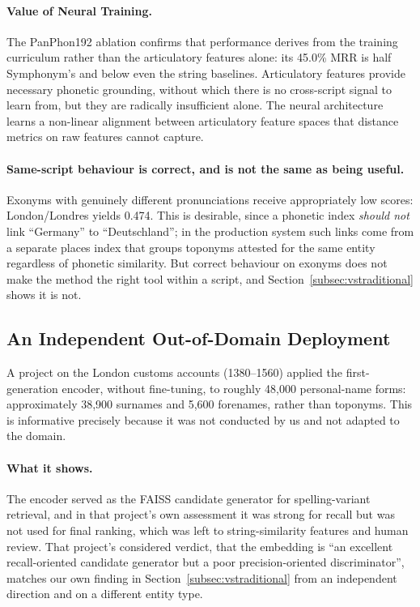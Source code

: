 \documentclass[11pt,a4paper]{article}
\begin{document}
\paragraph{Value of Neural Training.} The PanPhon192 ablation confirms that performance derives from the training curriculum rather than the articulatory features alone: its 45.0\% MRR is half Symphonym's and below even the string baselines. Articulatory features provide necessary phonetic grounding, without which there is no cross-script signal to learn from, but they are radically insufficient alone. The neural architecture learns a non-linear alignment between articulatory feature spaces that distance metrics on raw features cannot capture.

\paragraph{Same-script behaviour is correct, and is not the same as being useful.} Exonyms with genuinely different pronunciations receive appropriately low scores: London/Londres yields 0.474. This is desirable, since a phonetic index \emph{should not} link ``Germany'' to ``Deutschland''; in the production system such links come from a separate places index that groups toponyms attested for the same entity regardless of phonetic similarity. But correct behaviour on exonyms does not make the method the right tool within a script, and Section~\ref{subsec:vstraditional} shows it is not.

\subsection{An Independent Out-of-Domain Deployment}
\label{subsec:customs}

A project on the London customs accounts (1380--1560) applied the first-generation encoder, without fine-tuning, to roughly 48,000 personal-name forms: approximately 38,900 surnames and 5,600 forenames, rather than toponyms. This is informative precisely because it was not conducted by us and not adapted to the domain.

\paragraph{What it shows.} The encoder served as the FAISS candidate generator for spelling-variant retrieval, and in that project's own assessment it was strong for recall but was not used for final ranking, which was left to string-similarity features and human review. That project's considered verdict, that the embedding is ``an excellent recall-oriented candidate generator but a poor precision-oriented discriminator'', matches our own finding in Section~\ref{subsec:vstraditional} from an independent direction and on a different entity type.
\end{document}
